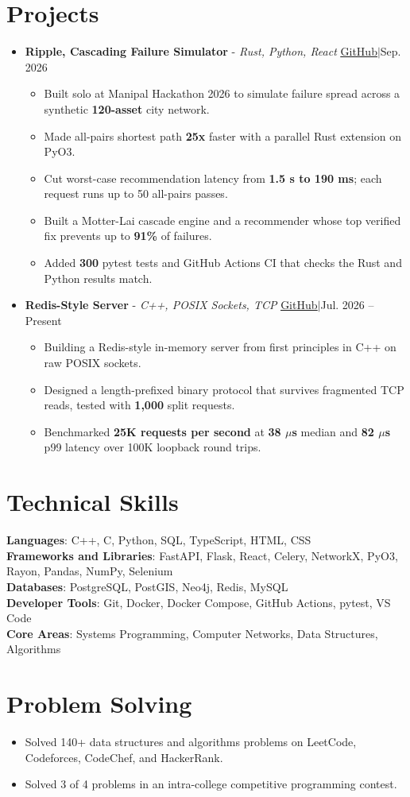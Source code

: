 \documentclass[letterpaper,11pt]{article}
\newcommand{\metric}[1]{\textbf{#1}}
\newcommand{\ulink}[2]{\href{#1}{\underline{#2\vphantom{/}}}}
\newcommand{\repo}[1]{\ulink{https://github.com/AbeerMiglani/#1}{GitHub}\enspace$|$\enspace}
\newcommand{\smallbullet}{$\vcenter{\hbox{\tiny$\bullet$}}$}
\newcommand{\resumeItem}[1]{
  \item\small{
    {#1 \vspace{-2pt}}
  }
}
\newcommand{\resumeProjectHeading}[2]{
  \item
    \small #1 \hfill #2%
  \vspace{-5pt}
}
\newcommand{\resumeSubHeadingListStart}{\begin{itemize}[leftmargin=0.15in, label={}]}
\newcommand{\resumeSubHeadingListEnd}{\end{itemize}}
\newcommand{\resumeItemListStart}{\begin{itemize}[leftmargin=0.2in, label={\smallbullet}]}
\newcommand{\resumeItemListEnd}{\end{itemize}\vspace{-5pt}}
\newcommand{\resumeTopItemListStart}{\begin{itemize}[leftmargin=0.35in, label={\smallbullet}]}
\begin{document}
\section{Projects}
\resumeSubHeadingListStart
    \resumeProjectHeading
      {\textbf{Ripple, Cascading Failure Simulator} - \emph{Rust, Python, React}}{\repo{ripple}Sep. 2026}
      \resumeItemListStart
        \resumeItem{Built solo at Manipal Hackathon 2026 to simulate failure spread across a synthetic \metric{120-asset} city network.}
        \resumeItem{Made all-pairs shortest path \metric{25x} faster with a parallel Rust extension on PyO3.}
        \resumeItem{Cut worst-case recommendation latency from \metric{1.5 s to 190 ms}; each request runs up to 50 all-pairs passes.}
        \resumeItem{Built a Motter-Lai cascade engine and a recommender whose top verified fix prevents up to \metric{91\%} of failures.}
        \resumeItem{Added \metric{300} pytest tests and GitHub Actions CI that checks the Rust and Python results match.}
      \resumeItemListEnd

    \resumeProjectHeading
      {\textbf{Redis-Style Server} - \emph{C++, POSIX Sockets, TCP}}{\repo{redis-cpp}Jul. 2026 -- Present}
      \resumeItemListStart
        \resumeItem{Building a Redis-style in-memory server from first principles in C++ on raw POSIX sockets.}
        \resumeItem{Designed a length-prefixed binary protocol that survives fragmented TCP reads, tested with \metric{1,000} split requests.}
        \resumeItem{Benchmarked \metric{25K requests per second} at \metric{38 $\mu$s} median and \metric{82 $\mu$s} p99 latency over 100K loopback round trips.}
      \resumeItemListEnd
\resumeSubHeadingListEnd

\section{Technical Skills}
\begin{itemize}[leftmargin=0.15in, label={}]
    \small{\item{
     \textbf{Languages}{: C++, C, Python, SQL, TypeScript, HTML, CSS} \\
     \textbf{Frameworks and Libraries}{: FastAPI, Flask, React, Celery, NetworkX, PyO3, Rayon, Pandas, NumPy, Selenium} \\
     \textbf{Databases}{: PostgreSQL, PostGIS, Neo4j, Redis, MySQL} \\
     \textbf{Developer Tools}{: Git, Docker, Docker Compose, GitHub Actions, pytest, VS Code} \\
     \textbf{Core Areas}{: Systems Programming, Computer Networks, Data Structures, Algorithms}
    }}
\end{itemize}

\section{Problem Solving}
\resumeTopItemListStart
    \resumeItem{Solved 140+ data structures and algorithms problems on LeetCode, Codeforces, CodeChef, and HackerRank.}
    \resumeItem{Solved 3 of 4 problems in an intra-college competitive programming contest.}
\resumeItemListEnd
\end{document}
